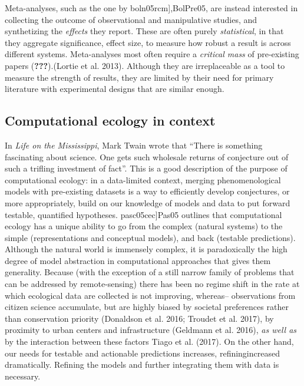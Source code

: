 \documentclass[11pt,serif]{article}
\begin{document}
Meta-analyses, such as the one by
\color{gray}{[}boln05rcm{]},\color{black}\color{purple}BolPre05,\color{black}
are instead interested in collecting the outcome of observational and
manipulative studies, and synthetizing the \emph{effects} they report.
These are often purely \emph{statistical}, in that they aggregate
significance, effect size, to measure how robust a result is across
different systems. Meta-analyses most often require a \emph{critical
mass} of pre-existing papers
\color{gray}({\textbf{???}}).\color{black}\color{purple}(Lortie et al.
2013).\color{black} Although they are irreplaceable as a tool to measure
the strength of results, they are limited by their need for primary
literature with experimental designs that are similar enough.

\subsection{Computational ecology in
context}\label{computational-ecology-in-context}

In \emph{Life on the Mississippi}, Mark Twain wrote that ``There is
something fascinating about science. One gets such wholesale returns of
conjecture out of such a trifling investment of fact''. This is a good
description of the purpose of computational ecology: in a data-limited
context, merging phenomenological models with pre-existing datasets is a
way to efficiently develop conjectures, or more appropriately, build on
our knowledge of models and data to put forward testable, quantified
hypotheses.
\color{gray}{[}pasc05cec{]}\color{black}\color{purple}Pas05\color{black}
outlines that computational ecology has a unique ability to go from the
complex (natural systems) to the simple (representations and conceptual
models), and back (testable predictions). Although the natural world is
immensely complex, it is paradoxically the high degree of model
abstraction in computational approaches that gives them generality.
Because (with the exception of a still narrow family of problems that
can be addressed by remote-sensing) \color{purple}there has been no
regime shift in\color{black} the rate at which ecological data are
collected \color{gray}is not improving,
whereas\color{black}\color{purple}-- observations from citizen
science\color{black} \color{purple}accumulate, but are highly biased by
societal preferences rather than\color{black} \color{purple}conservation
priority (Donaldson et al. 2016; Troudet et al. 2017), by proximity to
urban centers and\color{black} \color{purple}infrastructure (Geldmann et
al. 2016), \emph{as well as} by the interaction between
these\color{black} \color{purple}factors Tiago et al. (2017). On the
other hand,\color{black} our needs for testable and actionable
predictions \color{gray}increases,
refining\color{black}\color{purple}increased dramatically.
Refining\color{black} the models and further integrating them with data
is necessary.
\end{document}
